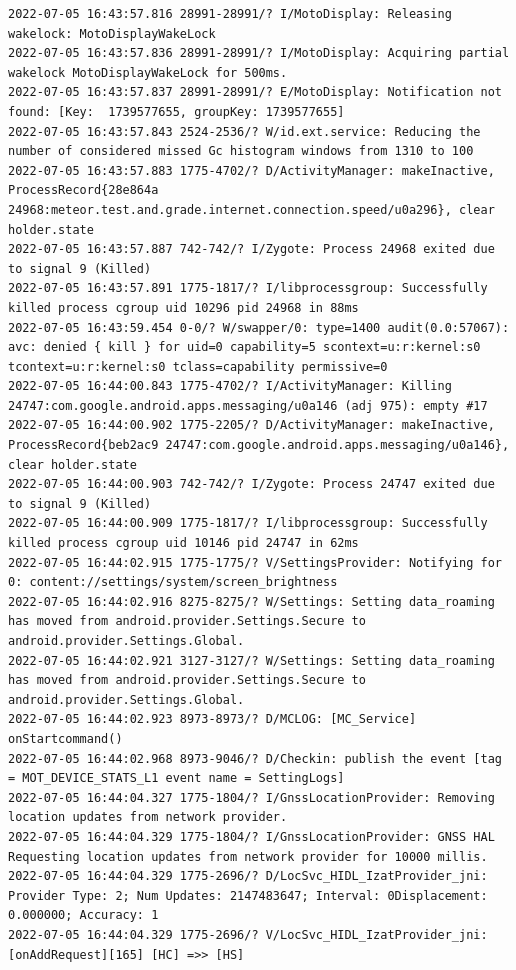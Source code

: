 \documentclass[a4paper,12pt]{book}
\begin{document}
\begin{lstlisting}
2022-07-05 16:43:57.816 28991-28991/? I/MotoDisplay: Releasing wakelock: MotoDisplayWakeLock
2022-07-05 16:43:57.836 28991-28991/? I/MotoDisplay: Acquiring partial wakelock MotoDisplayWakeLock for 500ms.
2022-07-05 16:43:57.837 28991-28991/? E/MotoDisplay: Notification not found: [Key:  1739577655, groupKey: 1739577655]
2022-07-05 16:43:57.843 2524-2536/? W/id.ext.service: Reducing the number of considered missed Gc histogram windows from 1310 to 100
2022-07-05 16:43:57.883 1775-4702/? D/ActivityManager: makeInactive, ProcessRecord{28e864a 24968:meteor.test.and.grade.internet.connection.speed/u0a296}, clear holder.state
2022-07-05 16:43:57.887 742-742/? I/Zygote: Process 24968 exited due to signal 9 (Killed)
2022-07-05 16:43:57.891 1775-1817/? I/libprocessgroup: Successfully killed process cgroup uid 10296 pid 24968 in 88ms
2022-07-05 16:43:59.454 0-0/? W/swapper/0: type=1400 audit(0.0:57067): avc: denied { kill } for uid=0 capability=5 scontext=u:r:kernel:s0 tcontext=u:r:kernel:s0 tclass=capability permissive=0
2022-07-05 16:44:00.843 1775-4702/? I/ActivityManager: Killing 24747:com.google.android.apps.messaging/u0a146 (adj 975): empty #17
2022-07-05 16:44:00.902 1775-2205/? D/ActivityManager: makeInactive, ProcessRecord{beb2ac9 24747:com.google.android.apps.messaging/u0a146}, clear holder.state
2022-07-05 16:44:00.903 742-742/? I/Zygote: Process 24747 exited due to signal 9 (Killed)
2022-07-05 16:44:00.909 1775-1817/? I/libprocessgroup: Successfully killed process cgroup uid 10146 pid 24747 in 62ms
2022-07-05 16:44:02.915 1775-1775/? V/SettingsProvider: Notifying for 0: content://settings/system/screen_brightness
2022-07-05 16:44:02.916 8275-8275/? W/Settings: Setting data_roaming has moved from android.provider.Settings.Secure to android.provider.Settings.Global.
2022-07-05 16:44:02.921 3127-3127/? W/Settings: Setting data_roaming has moved from android.provider.Settings.Secure to android.provider.Settings.Global.
2022-07-05 16:44:02.923 8973-8973/? D/MCLOG: [MC_Service] onStartcommand()
2022-07-05 16:44:02.968 8973-9046/? D/Checkin: publish the event [tag = MOT_DEVICE_STATS_L1 event name = SettingLogs]
2022-07-05 16:44:04.327 1775-1804/? I/GnssLocationProvider: Removing location updates from network provider.
2022-07-05 16:44:04.329 1775-1804/? I/GnssLocationProvider: GNSS HAL Requesting location updates from network provider for 10000 millis.
2022-07-05 16:44:04.329 1775-2696/? D/LocSvc_HIDL_IzatProvider_jni: Provider Type: 2; Num Updates: 2147483647; Interval: 0Displacement: 0.000000; Accuracy: 1
2022-07-05 16:44:04.329 1775-2696/? V/LocSvc_HIDL_IzatProvider_jni: [onAddRequest][165] [HC] =>> [HS]

\end{lstlisting}
\end{document}
